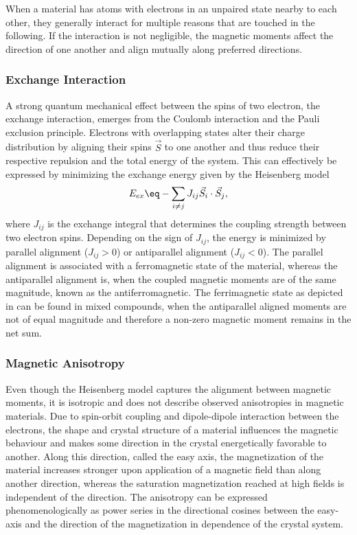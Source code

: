 \documentclass[\main/dresen_thesis.tex]{subfiles}
\begin{document}
      When a material has atoms with electrons in an unpaired state nearby to each other, they generally interact for multiple reasons that are touched in the following.
      If the interaction is not negligible, the magnetic moments affect the direction of one another and align mutually along preferred directions.
      \subsubsection{Exchange Interaction}
        A strong quantum mechanical effect between the spins of two electron, the exchange interaction, emerges from the Coulomb interaction and the Pauli exclusion principle.
        Electrons with overlapping states alter their charge distribution by aligning their spins $\vec{S}$ to one another and thus reduce their respective repulsion and the total energy of the system.
        This can effectively be expressed by minimizing the exchange energy given by the Heisenberg model
        \begin{align}
          E_{ex} \eq -\sum_{i \neq j} J_{ij} \vec{S}_i \cdot \vec{S}_j,
        \end{align}
        where $J_{ij}$ is the exchange integral that determines the coupling strength between two electron spins.
        Depending on the sign of $J_{ij}$, the energy is minimized by parallel alignment ($J_{ij} > 0$) or antiparallel alignment ($J_{ij} < 0$).
        The parallel alignment is associated with a ferromagnetic state of the material, whereas the antiparallel alignment is, when the coupled magnetic moments are of the same magnitude, known as the antiferromagnetic.
        The ferrimagnetic state as depicted in  can be found in mixed compounds, when the antiparallel aligned moments are not of equal magnitude and therefore a non-zero magnetic moment remains in the net sum.

      \subsubsection{Magnetic Anisotropy}
        Even though the Heisenberg model captures the alignment between magnetic moments, it is isotropic and does not describe observed anisotropies in magnetic materials.
        Due to spin-orbit coupling and dipole-dipole interaction between the electrons, the shape and crystal structure of a material influences the magnetic behaviour and makes some direction in the crystal energetically favorable to another.
        Along this direction, called the easy axis, the magnetization of the material increases stronger upon application of a magnetic field than along another direction, whereas the saturation magnetization reached at high fields is independent of the direction.
        The anisotropy can be expressed phenomenologically as power series in the directional cosines between the easy-axis and the direction of the magnetization in dependence of the crystal system.
\end{document}
